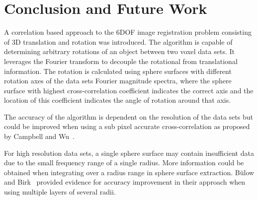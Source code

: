 \section{Conclusion and Future Work}
A correlation based approach to the 6DOF image registration problem consisting of 3D translation and rotation was introduced.
The algorithm is capable of determining arbitrary rotations of an object between two voxel data sets.
It leverages the Fourier transform to decouple the rotational from translational information.
The rotation is calculated using sphere surfaces with different rotation axes of the data sets Fourier magnitude spectra, where the sphere surface with highest cross-correlation coefficient indicates the correct axis and the location of this coefficient indicates the angle of rotation around that axis.

The accuracy of the algorithm is dependent on the resolution of the data sets but could be improved when using a sub pixel accurate cross-correlation as proposed by Campbell and Wu~\cite{campbell08gradientcrosscorr}.

For high resolution data sets, a single sphere surface may contain insufficient data due to the small frequency range of a single radius.
More information could be obtained when integrating over a radius range in sphere surface extraction. 
B\"ulow and Birk~\cite{bulow13dof6registration} provided evidence for accuracy improvement in their approach when using multiple layers of several radii.